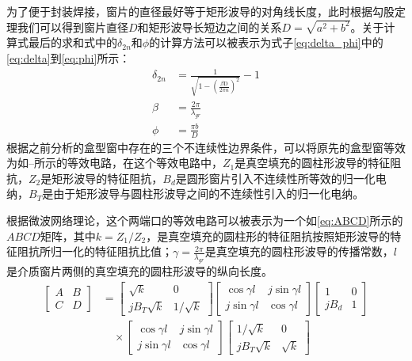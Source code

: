 \documentclass[master]{thesis-uestc}
\begin{document}
为了便于封装焊接，窗片的直径最好等于矩形波导的对角线长度，此时根据勾股定理我们可以得到窗片直径$D$和矩形波导长短边之间的关系$D=\sqrt{a^2+b^2} $。关于计算式最后的求和式中的$\delta_{2n}$和$\phi$的计算方法可以被表示为式子\ref{eq:delta_phi}中的\ref{eq:delta}到\ref{eq:phi}所示：
\begin{subequations}\label{eq:delta_phi}
\begin{align}
    \delta_{2 n} &= \frac{1}{\sqrt{1-\left(\frac{\beta \mathrm{D}}{2 \pi n}\right)^{2}}}-1 \label{eq:delta}\\
    \beta &= \frac{2 \pi}{\lambda_{gr}} \label{eq:beta}\\
    \phi &= \frac{\pi b}{D} \label{eq:phi}
\end{align}
\end{subequations}
根据之前分析的盒型窗中存在的三个不连续性边界条件，可以将原先的盒型窗等效为如--所示的等效电路，在这个等效电路中，$Z_{1}$是真空填充的圆柱形波导的特征阻抗，$Z_{2}$是矩形波导的特征阻抗，$B_{d}$是圆形窗片引入不连续性所等效的归一化电纳，$B_{T}$是由于矩形波导与圆柱形波导之间的不连续性引入的归一化电纳。

根据微波网络理论，这个两端口的等效电路可以被表示为一个如\ref{eq:ABCD}所示的$ABCD$矩阵，其中$k=Z_{1}/Z_{2}$，是真空填充的圆柱形的特征阻抗按照矩形波导的特征阻抗所归一化的特征阻抗比值；$\gamma=\frac{2 \pi}{\lambda_{gr}}$是真空填充的圆柱形波导的传播常数，$l$是介质窗片两侧的真空填充的圆柱形波导的纵向长度。
\begin{equation}\label{eq:ABCD}
    \begin{split}
        \begin{bmatrix}
            A & B \\
            C & D
        \end{bmatrix} 
        & = 
        \begin{bmatrix}
            \sqrt{k} & 0 \\
            jB_{T}\sqrt{k} & 1/\sqrt{k}
        \end{bmatrix}
        \begin{bmatrix}
            \cos{\gamma l} & j\sin{\gamma l} \\
            j\sin{\gamma l} & \cos{\gamma l}
        \end{bmatrix}
        \begin{bmatrix}
            1 & 0 \\
            jB_{d} & 1
        \end{bmatrix} \\
        & \quad \times 
        \begin{bmatrix}
            \cos{\gamma l} & j\sin{\gamma l} \\
            j\sin{\gamma l} & \cos{\gamma l}
        \end{bmatrix}
        \begin{bmatrix}
            1/\sqrt{k} & 0 \\
            jB_{T}\sqrt{k} & \sqrt{k}
        \end{bmatrix}
    \end{split}
\end{equation}
\end{document}
